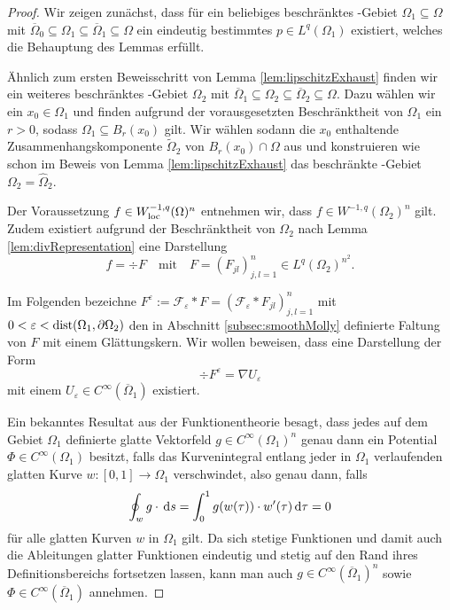 \begin{proof}
  Wir zeigen zunächst, dass für ein beliebiges beschränktes \lipschitz\hyp{}Gebiet $\Omega_1 \subseteq \Omega$ mit $\overline\Omega_0 \subseteq \Omega_1 \subseteq \overline\Omega_1 \subseteq \Omega$ ein eindeutig bestimmtes $p \in L^q(\Omega_1)$ existiert, welches die Behauptung des Lemmas erfüllt.

  Ähnlich zum ersten Beweisschritt von Lemma \ref{lem:lipschitzExhaust} finden wir ein weiteres beschränktes \lipschitz\hyp{}Gebiet $\Omega_2$ mit $\overline\Omega_1 \subseteq \Omega_2 \subseteq \overline\Omega_2 \subseteq \Omega$.
  Dazu wählen wir ein $x_0 \in \Omega_1$ und finden aufgrund der vorausgesetzten Beschränktheit von $\Omega_1$ ein $r > 0$, sodass $\Omega_1 \subseteq B_r(x_0)$ gilt.
  Wir wählen sodann die $x_0$ enthaltende Zusammenhangskomponente $\widetilde\Omega_2$ von $B_r(x_0) \cap \Omega$ aus und konstruieren wie schon im Beweis von Lemma \ref{lem:lipschitzExhaust} das beschränkte \lipschitz\hyp{}Gebiet $\Omega_2 = \widehat\Omega_2$.

  Der Voraussetzung $f \in W_{\operatorname{loc}}^{-1,q}(\Omega)^n$ entnehmen wir, dass $f \in W^{-1,q}(\Omega_2)^n$ gilt. Zudem existiert aufgrund der Beschränktheit von $\Omega_2$ nach Lemma \ref{lem:divRepresentation} eine Darstellung
  $$
  f = \div F \quad\text{mit}\quad F = (F_{jl})_{j,l=1}^n \in L^q(\Omega_2)^{n^2}.
  $$

  Im Folgenden bezeichne $F^\varepsilon := \mathcal{F}_\varepsilon \ast F = (\mathcal{F}_\varepsilon \ast F_{jl})_{j,l=1}^n$ mit $0 < \varepsilon < \operatorname{dist}(\Omega_1, \partial\Omega_2)$ den in Abschnitt \ref{subsec:smoothMolly} definierte Faltung von $F$ mit einem Glättungskern.
  Wir wollen beweisen, dass eine Darstellung der Form
  $$
  \div F^\varepsilon = \nabla U_\varepsilon
  $$
  mit einem $U_\varepsilon \in C^\infty(\overline\Omega_1)$ existiert.

  Ein bekanntes Resultat aus der Funktionentheorie besagt, dass jedes auf dem Gebiet $\Omega_1$ definierte glatte Vektorfeld $g \in C^\infty(\Omega_1)^n$ genau dann ein Potential $\Phi \in C^\infty(\Omega_1)$ besitzt, falls das Kurvenintegral entlang jeder in $\Omega_1$ verlaufenden glatten Kurve $w \colon [0,1] \to \Omega_1$ verschwindet, also genau dann, falls
  $$
  \oint_w g \cdot \, {\operatorname{d}\!{s}} = \int_0^1 g(w(\tau))\cdot w'(\tau) \, {\operatorname{d}\!{\tau}} = 0
  $$
  für alle glatten Kurven $w$ in $\Omega_1$ gilt.
  Da sich stetige Funktionen und damit auch die Ableitungen glatter Funktionen eindeutig und stetig auf den Rand ihres Definitionsbereichs fortsetzen lassen, kann man auch $g \in C^\infty(\overline\Omega_1)^n$ sowie $\Phi \in C^\infty(\overline\Omega_1)$ annehmen.


\end{proof}
